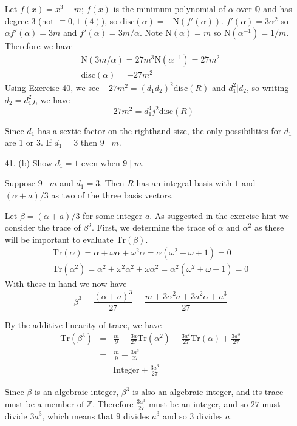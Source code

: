 \documentclass{article}
\newcommand{\w}[0]{\omega}
\newcommand{\Q}[0]{\mathbb{Q}}
\newcommand{\Z}[0]{\mathbb{Z}}
\newcommand{\trace}[1]{\text{Tr}(#1)}
\newcommand{\norm}[0]{\text{N}}
\newcommand{\disc}[1]{\text{disc}(#1)}
\begin{document}
\begin{enumerate}
Let $f(x) = x^3 - m$; $f(x)$ is the minimum polynomial of $\alpha$ over $\Q$ and has degree 3 (not $\equiv 0, 1\ (4)$), so $\disc{\alpha} = -\norm(f'(\alpha))$.  $f'(\alpha) = 3\alpha^2$ so $\alpha f'(\alpha) = 3m$ and $f'(\alpha) = 3m / \alpha$.  Note $\norm(\alpha) = m$ so $\norm(\alpha^{-1}) = 1/m$.  Therefore we have
\begin{gather*}
    \norm(3m/\alpha) = 27m^3 \norm(\alpha^{-1}) = 27m^2 \\
    \disc{\alpha} = -27m^2
\end{gather*}
Using Exercise 40, we see $-27m^2 = (d_1 d_2)^2 \disc{R}$ and $d_1^2 | d_2$, so writing $d_2 = d_1^2 j$, we have \[ -27m^2 = d_1^4 j^2 \disc{R} \]

Since $d_1$ has a sextic factor on the righthand-size, the only possibilities for $d_1$ are 1 or 3.  If $d_1 = 3$ then $9 \mid m$.

\item[41. (b)]  Show $d_1 = 1$ even when $9 \mid m$.

Suppose $9 \mid m$ and $d_1 = 3$.  Then $R$ has an integral basis with $1$ and $(\alpha + a)/3$ as two of the three basis vectors.

Let $\beta = (\alpha + a) / 3$ for some integer $a$.  As suggested in the exercise hint we consider the trace of $\beta^3$.  First, we determine the trace of $\alpha$ and $\alpha^2$ as these will be important to evaluate $\trace{\beta}$.
\begin{gather*}
    \trace{\alpha} = \alpha + \w\alpha + \w^2\alpha = \alpha(\w^2 + \w + 1) = 0\\
    \trace{\alpha^2} = \alpha^2 + \w^2 \alpha^2 + \w\alpha^2 = \alpha^2(\w^2 + \w + 1) = 0
\end{gather*}
With these in hand we now have \[ \beta^3 = \frac{(\alpha + a)^3}{27} = \frac{m + 3\alpha^2 a + 3a^2 \alpha + a^3}{27} \]

By the additive linearity of trace, we have
\begin{eqnarray*}
    \trace{\beta^3} &=& \frac{m}{9} + \frac{3a}{27}\trace{\alpha^2} + \frac{3a^2}{27}\trace{\alpha} + \frac{3a^3}{27}\\
    &=& \frac{m}{9} + \frac{3a^3}{27} \\
    &=& \text{Integer} + \frac{3a^3}{27}
\end{eqnarray*}

Since $\beta$ is an algebraic integer, $\beta^3$ is also an algebraic integer, and its trace must be a member of $\Z$.  Therefore $\frac{3a^3}{27}$ must be an integer, and so $27$ must divide $3a^3$, which means that $9$ divides $a^3$ and so 3 divides $a$.


\end{enumerate}
\end{document}
